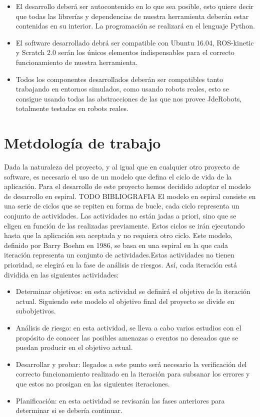 \begin{itemize}
\item El desarrollo deberá ser autocontenido en lo que sea posible, esto quiere decir que todas las librerías y dependencias de nuestra herramienta deberán estar contenidas en su interior. La programación se realizará en el
lenguaje Python.
\item El software desarrollado debrá ser compatible con Ubuntu 16.04, ROS-kinetic y Scratch 2.0 serán los únicos elementos indispensables para el correcto funcionamiento de nuestra herramienta.
\item Todos los componentes desarrollados deberán ser compatibles tanto trabajando en entornos simulados, como usando robots reales, esto se consigue usando todas las abstracciones de las que nos provee JdeRobots, totalmente testadas en robots reales.
\end{itemize}



\section{Metdología de trabajo}
\label{sec:metodologia}

Dada la naturaleza del proyecto, y al igual que en cualquier otro proyecto de software, es necesario el uso de un modelo que defina el ciclo de vida de la aplicación. Para el desarrollo de este proyecto hemos decidido adoptar el modelo de desarrollo en espiral.
TODO BIBLIOGRAFIA
El modelo en espiral consiste en una serie de ciclos que se repiten en forma de
bucle, cada ciclo representa un conjunto de actividades. Las actividades no están
jadas a priori, sino que se eligen en función de las realizadas previamente. Estos
ciclos se irán ejecutando hasta que la aplicación sea aceptada y no requiera otro
ciclo. Este modelo, definido por Barry Boehm en 1986, se basa en una espiral en la que cada iteración representa un conjunto de actividades.Estas actividades no tienen prioridad, se elegirá en la fase de análisis de riesgos. Así, cada iteración está dividida en las siguientes actividades:

\begin{itemize}
\item Determinar objetivos: en esta actividad se definirá el objetivo de la iteración actual. Siguiendo este
modelo el objetivo final del proyecto se divide en subobjetivos.
\item Análisis de riesgo: en esta actividad, se lleva a cabo varios estudios con el propósito de conocer las
posibles amenazas o eventos no deseados que se puedan producir en el objetivo actual.
\item Desarrollar y probar: llegados a este punto será necesario la verificación del correcto funcionamiento realizado en la iteración para subsanar los errores y que estos no prosigan en las siguientes iteraciones.
\item Planificación: en esta actividad se revisarán las fases anteriores para determinar si se debería continuar.
\end{itemize}

